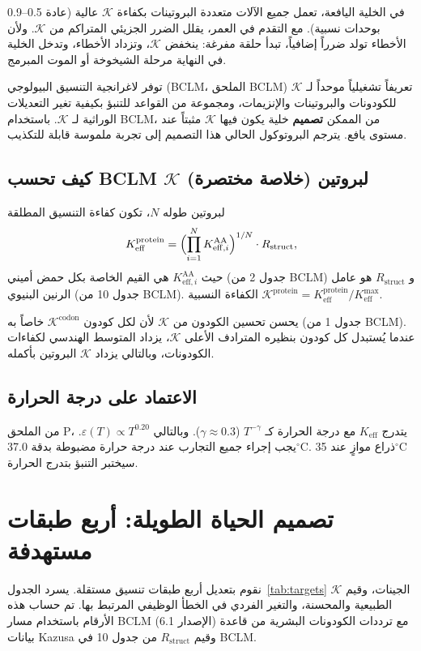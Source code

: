 \documentclass[11pt,a4paper]{article}
\newcommand{\REL}{\mathcal{K}}          %
\begin{document}
	في الخلية اليافعة، تعمل جميع الآلات متعددة البروتينات بكفاءة \(\REL\) عالية (عادة 0.5–0.9 بوحدات نسبية). مع التقدم في العمر، يقلل الضرر الجزيئي المتراكم من \(\REL\). ولأن الأخطاء تولد ضرراً إضافياً، تبدأ حلقة مفرغة: ينخفض \(\REL\)، وتزداد الأخطاء، وتدخل الخلية في النهاية مرحلة الشيخوخة أو الموت المبرمج.
	
	توفر لاغرانجية التنسيق البيولوجي (BCLM، الملحق BCLM) تعريفاً تشغيلياً موحداً لـ \(\REL\) للكودونات والبروتينات والإنزيمات، ومجموعة من القواعد للتنبؤ بكيفية تغير التعديلات الوراثية لـ \(\REL\). باستخدام BCLM، من الممكن \textbf{تصميم} خلية يكون فيها \(\REL\) مثبتاً عند مستوى يافع. يترجم البروتوكول الحالي هذا التصميم إلى تجربة ملموسة قابلة للتكذيب.
	
	\subsection{كيف تحسب BCLM \(\REL\) لبروتين (خلاصة مختصرة)}
	لبروتين طوله \(N\)، تكون كفاءة التنسيق المطلقة
	\[
	K_{\mathrm{eff}}^{\mathrm{protein}} = \Bigl( \prod_{i=1}^{N} K_{\mathrm{eff},i}^{\mathrm{AA}} \Bigr)^{1/N} \cdot R_{\mathrm{struct}},
	\]
	حيث \(K_{\mathrm{eff},i}^{\mathrm{AA}}\) هي القيم الخاصة بكل حمض أميني (جدول 2 من BCLM) و \(R_{\mathrm{struct}}\) هو عامل الرنين البنيوي (جدول 10 من BCLM). الكفاءة النسبية \(\REL^{\mathrm{protein}} = K_{\mathrm{eff}}^{\mathrm{protein}}/K_{\mathrm{eff}}^{\max}\).
	
	يحسن تحسين الكودون من \(\REL\) لأن لكل كودون \(\REL^{\mathrm{codon}}\) خاصاً به (جدول 1 من BCLM). عندما يُستبدل كل كودون بنظيره المترادف الأعلى \(\REL\)، يزداد المتوسط الهندسي لكفاءات الكودونات، وبالتالي يزداد \(\REL\) البروتين بأكمله.
	
	\subsection{الاعتماد على درجة الحرارة}
	من الملحق P، يتدرج \(K_{\mathrm{eff}}\) مع درجة الحرارة كـ \(T^{-\gamma}\) (\(\gamma\approx0.3\)). وبالتالي \(\varepsilon(T) \propto T^{0.20}\). يجب إجراء جميع التجارب عند درجة حرارة مضبوطة بدقة 37.0\(^\circ\)C. ذراع موازٍ عند 35\(^\circ\)C سيختبر التنبؤ بتدرج الحرارة.
	
	\section{تصميم الحياة الطويلة: أربع طبقات مستهدفة}
	\label{sec:layers}
	نقوم بتعديل أربع طبقات تنسيق مستقلة. يسرد الجدول~\ref{tab:targets} الجينات، وقيم \(\REL\) الطبيعية والمحسنة، والتغير الفردي في الخطأ الوظيفي المرتبط بها. تم حساب هذه الأرقام باستخدام مسار BCLM (الإصدار 6.1) مع ترددات الكودونات البشرية من قاعدة بيانات Kazusa وقيم \(R_{\mathrm{struct}}\) من جدول 10 في BCLM.
	
\end{document}
